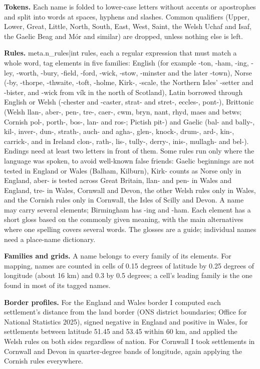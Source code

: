 \documentclass[11pt,a4paper]{article}
\begin{document}
\textbf{Tokens.} Each name is folded to lower-case letters without accents or apostrophes and split into words at spaces, hyphens and slashes. Common qualifiers (Upper, Lower, Great, Little, North, South, East, West, Saint, the Welsh Uchaf and Isaf, the Gaelic Beag and Mór and similar) are dropped, unless nothing else is left.

\textbf{Rules.} {{meta.n_rules|int}} rules, each a regular expression that must match a whole word, tag elements in five families: English (for example -ton, -ham, -ing, -ley, -worth, -bury, -field, -ford, -wick, -stow, -minster and the later -town), Norse (-by, -thorpe, -thwaite, -toft, -holme, Kirk-, -scale, the Northern Isles' -setter and -bister, and -wick from vík in the north of Scotland), Latin borrowed through English or Welsh (-chester and -caster, strat- and stret-, eccles-, pont-), Brittonic (Welsh llan-, aber-, pen-, tre-, caer-, cwm, bryn, nant, rhyd, maes and betws; Cornish pol-, porth-, bos-, lan- and ros-; Pictish pit-) and Gaelic (bal- and bally-, kil-, inver-, dun-, strath-, auch- and agha-, glen-, knock-, drum-, ard-, kin-, carrick-, and in Ireland clon-, rath-, lis-, tully-, derry-, inis-, mullagh- and bel-). Endings need at least two letters in front of them. Some rules run only where the language was spoken, to avoid well-known false friends: Gaelic beginnings are not tested in England or Wales (Balham, Kilburn), Kirk- counts as Norse only in England, aber- is tested across Great Britain, llan- and pen- in Wales and England, tre- in Wales, Cornwall and Devon, the other Welsh rules only in Wales, and the Cornish rules only in Cornwall, the Isles of Scilly and Devon. A name may carry several elements; Birmingham has -ing and -ham. Each element has a short gloss based on the commonly given meaning, with the main alternatives where one spelling covers several words. The glosses are a guide; individual names need a place-name dictionary.

\textbf{Families and grids.} A name belongs to every family of its elements. For mapping, names are counted in cells of 0.15 degrees of latitude by 0.25 degrees of longitude (about 16 km) and 0.3 by 0.5 degrees; a cell's leading family is the one found in most of its tagged names.

\textbf{Border profiles.} For the England and Wales border I computed each settlement's distance from the land border (ONS district boundaries; Office for National Statistics 2025), signed negative in England and positive in Wales, for settlements between latitude 51.45 and 53.45 within 60 km, and applied the Welsh rules on both sides regardless of nation. For Cornwall I took settlements in Cornwall and Devon in quarter-degree bands of longitude, again applying the Cornish rules everywhere.
\end{document}
